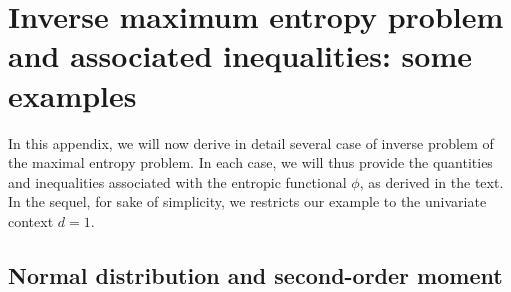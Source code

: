 \documentclass[entropy,article,submit,moreauthors,pdftex]{Definitions/mdpi}
\begin{document}
\vspace{6pt}

%
%
%
%
%




\appendixstart
\appendix


\section{Inverse  maximum  entropy  problem  and associated  inequalities:  some
  examples}
\label{secapp:MaxPhiEntExamples}

In this appendix, we  will now derive in detail several  case of inverse problem
of  the  maximal entropy  problem.   In  each case,  we  will  thus provide  the
quantities and inequalities  associated with the entropic  functional $\phi$, as
derived in  the text. In  the sequel, for sake  of simplicity, we  restricts our
example to the univariate context $d = 1$.




\subsection{Normal distribution and second-order moment}
\label{subsecapp:NormalSecondOrder}
\end{document}
